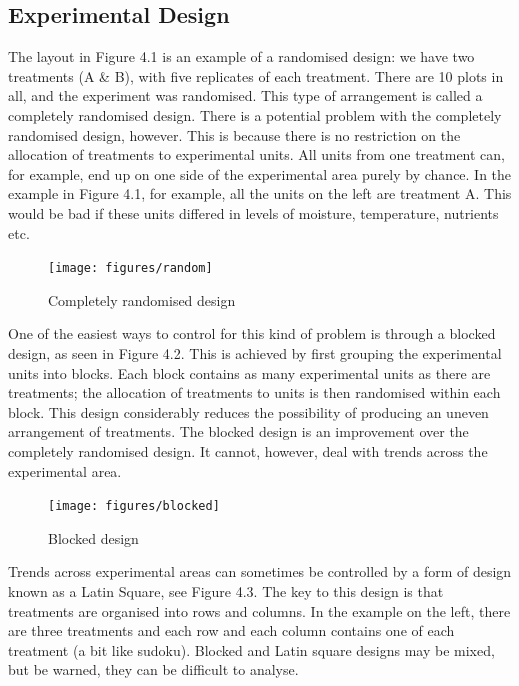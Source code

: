 \documentclass[
]{book}
\begin{document}
\subsection*{Experimental Design}\label{experimental-design}

The layout in Figure 4.1 is an example of a randomised design: we have two treatments (A \& B), with five replicates of each treatment. There are 10 plots in all, and the experiment was randomised. This type of arrangement is called a completely randomised design.
There is a potential problem with the completely randomised design, however. This is because there is no restriction on the allocation of treatments to experimental units. All units from one treatment can, for example, end up on one side of the experimental area purely by chance. In the example in Figure 4.1, for example, all the units on the left are treatment A. This would be bad if these units differed in levels of moisture, temperature, nutrients etc.

\begin{figure}
\texttt{[image: figures/random]} \caption{Completely randomised design}\label{fig:unnamed-chunk-43}
\end{figure}

One of the easiest ways to control for this kind of problem is through a blocked design, as seen in Figure 4.2. This is achieved by first grouping the experimental units into blocks. Each block contains as many experimental units as there are treatments; the allocation of treatments to units is then randomised within each block. This design considerably reduces the possibility of producing an uneven arrangement of treatments. The blocked design is an improvement over the completely randomised design. It cannot, however, deal with trends across the experimental area.

\begin{figure}
\texttt{[image: figures/blocked]} \caption{Blocked design}\label{fig:unnamed-chunk-44}
\end{figure}

Trends across experimental areas can sometimes be controlled by a form of design known as a Latin Square, see Figure 4.3. The key to this design is that treatments are organised into rows and columns. In the example on the left, there are three treatments and each row and each column contains one of each treatment (a bit like sudoku). Blocked and Latin square designs may be mixed, but be warned, they can be difficult to analyse.
\end{document}
